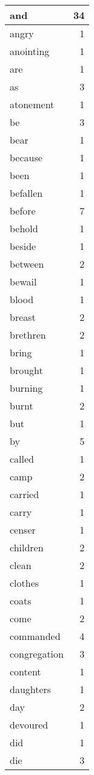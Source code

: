 \begin{center}
\begin{longtable}{l|r}
and & 34 \\ \hline
angry & 1 \\ \hline
anointing & 1 \\ \hline
are & 1 \\ \hline
as & 3 \\ \hline
atonement & 1 \\ \hline
be & 3 \\ \hline
bear & 1 \\ \hline
because & 1 \\ \hline
been & 1 \\ \hline
befallen & 1 \\ \hline
before & 7 \\ \hline
behold & 1 \\ \hline
beside & 1 \\ \hline
between & 2 \\ \hline
bewail & 1 \\ \hline
blood & 1 \\ \hline
breast & 2 \\ \hline
brethren & 2 \\ \hline
bring & 1 \\ \hline
brought & 1 \\ \hline
burning & 1 \\ \hline
burnt & 2 \\ \hline
but & 1 \\ \hline
by & 5 \\ \hline
called & 1 \\ \hline
camp & 2 \\ \hline
carried & 1 \\ \hline
carry & 1 \\ \hline
censer & 1 \\ \hline
children & 2 \\ \hline
clean & 2 \\ \hline
clothes & 1 \\ \hline
coats & 1 \\ \hline
come & 2 \\ \hline
commanded & 4 \\ \hline
congregation & 3 \\ \hline
content & 1 \\ \hline
daughters & 1 \\ \hline
day & 2 \\ \hline
devoured & 1 \\ \hline
did & 1 \\ \hline
die & 3 \\ \hline

\end{longtable}
\end{center}
